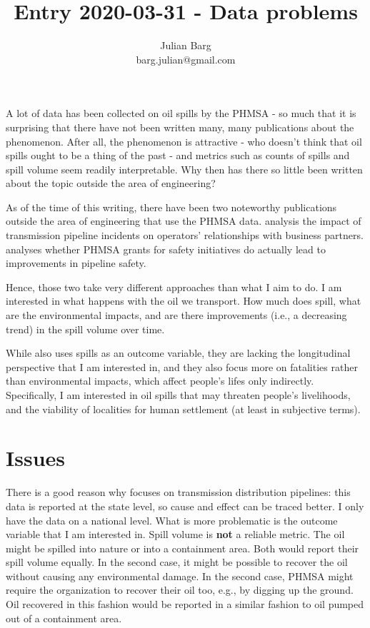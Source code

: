 \documentclass[12pt, man, natbib]{apa6}
\title{Entry 2020-03-31 - Data problems}
\author{Julian Barg\\barg.julian@gmail.com}
\affiliation{Ivey Business School}
\begin{document}
	
	\maketitle
	
	\singlespacing
	
	\section{}
	A lot of data has been collected on oil spills by the PHMSA - so much that it is surprising that there have not been written many, many publications about the phenomenon. After all, the phenomenon is attractive - who doesn't think that oil spills ought to be a thing of the past - and metrics such as counts of spills and spill volume seem readily interpretable. Why then has there so little been written about the topic outside the area of engineering?
	
	As of the time of this writing, there have been two noteworthy publications outside the area of engineering that use the PHMSA data. \citet{Park2019} analysis the impact of transmission pipeline incidents on operators' relationships with business partners. \citet{Scott2019} analyses whether PHMSA grants for safety initiatives do actually lead to improvements in pipeline safety.
	
	Hence, those two take very different approaches than what I aim to do. I am interested in what happens with the oil we transport. How much does spill, what are the environmental impacts, and are there improvements (i.e., a decreasing trend) in the spill volume over time.
	
	While \citet{Scott2019} also uses spills as an outcome variable, they are lacking the longitudinal perspective that I am interested in, and they also focus more on fatalities rather than environmental impacts, which affect people's lifes only indirectly. Specifically, I am interested in oil spills that may threaten people's livelihoods, and the viability of localities for human settlement (at least in subjective terms).
	
	\section{Issues}
	There is a good reason why \citet{Scott2019} focuses on transmission distribution pipelines: this data is reported at the state level, so cause and effect can be traced better. I only have the data on a national level. What is more problematic is the outcome variable that I am interested in. Spill volume is \textbf{not} a reliable metric. The oil might be spilled into nature or into a containment area. Both would report their spill volume equally. In the second case, it might be possible to recover the oil without causing any environmental damage. In the second case, PHMSA might require the organization to recover their oil too, e.g., by digging up the ground. Oil recovered in this fashion would be reported in a similar fashion to oil pumped out of a containment area.
	
\end{document}
